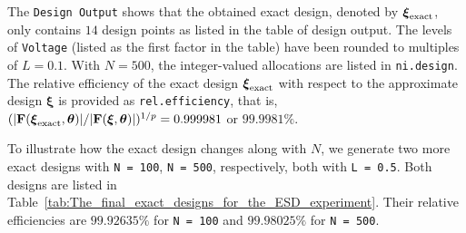The \verb|Design Output| shows that the obtained exact design, denoted by $\boldsymbol{\xi}_{\rm exact}$, only contains $14$ design points as listed in the table of design output. The levels of {\tt Voltage} (listed as the first factor in the table) have been rounded to multiples of $L = 0.1$. With $N = 500$, the integer-valued allocations are listed in {\tt ni.design}. 
The relative efficiency of the exact design $\boldsymbol{\xi}_{\rm exact}$ with respect to the approximate design $\boldsymbol{\xi}$ is provided as {\tt rel.efficiency}, that is, $(|{\mathbf F}(\boldsymbol{\xi}_{\rm exact}, \boldsymbol \theta)|/|{\mathbf F}(\boldsymbol{\xi}, \boldsymbol \theta)|)^{1/p} = 0.999981$ or $99.9981\%$. 

To illustrate how the exact design changes along with $N$, we generate two more exact designs with \verb|N = 100|, \verb|N = 500|, respectively,  both with \verb|L = 0.5|. Both designs are listed in  Table~\ref{tab:The_final_exact_designs_for_the_ESD_experiment}. Their relative efficiencies are $99.92635\%$ for \verb|N = 100| and $99.98025\%$ for \verb|N = 500|.

